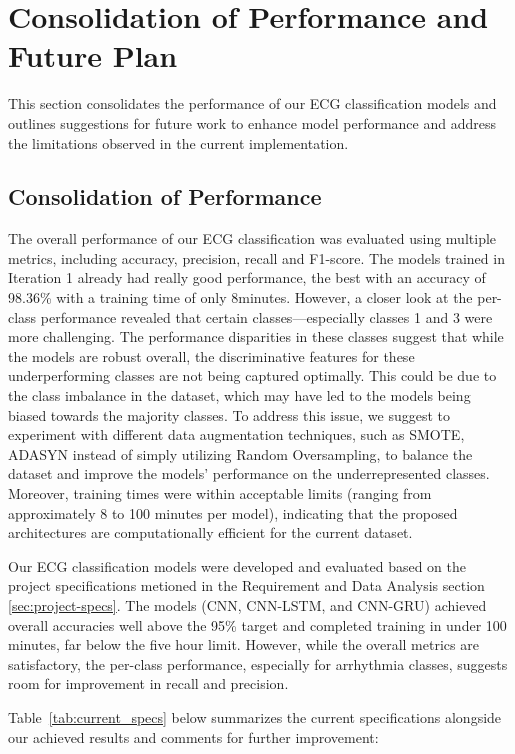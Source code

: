 \section{Consolidation of Performance and Future Plan}
This section consolidates the performance of our ECG classification models and outlines suggestions for future work to enhance model performance and address the limitations observed in the current implementation.

\subsection{Consolidation of Performance}
The overall performance of our ECG classification was evaluated using multiple metrics, including accuracy, precision, recall and F1-score. The models trained in Iteration 1 already had really good performance, the best with an accuracy of 98.36\% with a training time of only 8minutes.
However, a closer look at the per-class performance revealed that certain classes—especially classes 1 and 3 were more challenging. The performance disparities in these classes suggest that while the models are robust overall, the discriminative features for these underperforming classes are not being captured optimally. This could be due to the class imbalance in the dataset, which may have led to the models being biased towards the majority classes. To address this issue, we suggest to experiment with different data augmentation techniques, such as SMOTE, ADASYN instead of simply utilizing Random Oversampling, to balance the dataset and improve the models' performance on the underrepresented classes. 
Moreover, training times were within acceptable limits (ranging from approximately 8 to 100 minutes per model), indicating that the proposed architectures are computationally efficient for the current dataset.

Our ECG classification models were developed and evaluated based on the project specifications metioned in the Requirement and Data Analysis section \ref{sec:project-specs}. The models (CNN, CNN-LSTM, and CNN-GRU) achieved overall accuracies well above the 95\% target and completed training in under 100 minutes, far below the five hour limit. However, while the overall metrics are satisfactory, the per-class performance, especially for arrhythmia classes, suggests room for improvement in recall and precision.

Table~\ref{tab:current_specs} below summarizes the current specifications alongside our achieved results and comments for further improvement:

